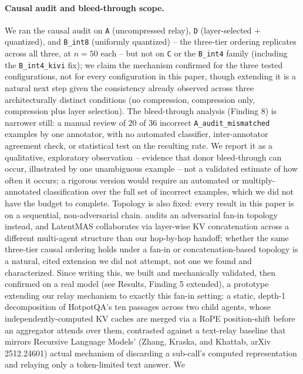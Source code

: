 \documentclass[11pt]{article}
\begin{document}
\paragraph{Causal audit and bleed-through scope.} We ran the causal audit
on \texttt{A} (uncompressed relay), \texttt{D} (layer-selected +
quantized), and \texttt{B\_int8} (uniformly quantized) -- the three-tier
ordering replicates across all three, at $n=50$ each -- but not on
\texttt{C} or the \texttt{B\_int4} family (including the
\texttt{B\_int4\_kivi} fix); we claim the mechanism confirmed for the
three tested configurations, not for every configuration in this paper,
though extending it is a natural next step given the consistency already
observed across three architecturally distinct conditions (no
compression, compression only, compression plus layer selection). The
bleed-through analysis (Finding 8) is narrower still: a manual review of
20 of 36 incorrect \texttt{A\_audit\_mismatched} examples by one
annotator, with no automated classifier, inter-annotator agreement check,
or statistical test on the resulting rate. We report it as a qualitative,
exploratory observation -- evidence that donor bleed-through can occur,
illustrated by one unambiguous example -- not a validated estimate of how
often it occurs; a rigorous version would require an automated or
multiply-annotated classification over the full set of incorrect
examples, which we did not have the budget to complete. Topology is also
fixed: every result in this paper is on a sequential, non-adversarial
chain. \citet{latentagentslie2026} audits an adversarial fan-in topology
instead, and LatentMAS \citep{latentmas2026} collaborates via layer-wise
KV concatenation across a different multi-agent structure than our
hop-by-hop handoff; whether the same three-tier causal ordering holds
under a fan-in or concatenation-based topology is a natural, cited
extension we did not attempt, not one we found and characterized. Since
writing this, we built and mechanically validated, then confirmed on a
real model (see Results, Finding 5 extended), a prototype extending our
relay mechanism to exactly this fan-in setting: a static, depth-1
decomposition of HotpotQA's ten passages across two child agents, whose
independently-computed KV caches are merged via a RoPE position-shift
before an aggregator attends over them, contrasted against a text-relay
baseline that mirrors Recursive Language Models' (Zhang, Kraska, and
Khattab, arXiv 2512.24601) actual mechanism of discarding a sub-call's
computed representation and relaying only a token-limited text answer. We
\end{document}
